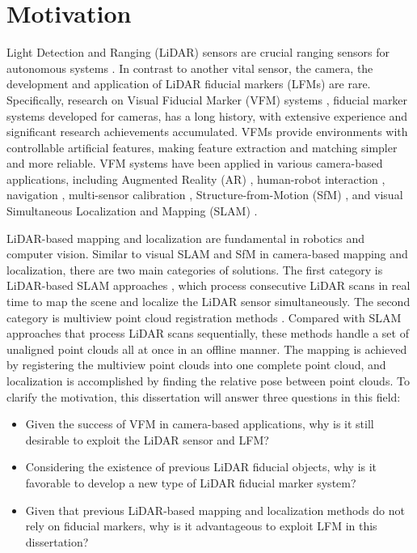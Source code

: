 \section{Motivation}
Light Detection and Ranging (LiDAR) sensors are crucial ranging sensors for autonomous systems \cite{loam,traj,rangenet}. In contrast to another vital sensor, the camera, the development and application of LiDAR fiducial markers (LFMs) are rare. Specifically, research on Visual Fiducial Marker (VFM) systems \cite{wang,olson,ap3,aruco,cctag}, fiducial marker systems developed for cameras, has a long history, with extensive experience and significant research achievements accumulated. VFMs provide environments with controllable artificial features, making feature extraction and matching simpler and more reliable. VFM systems have been applied in various camera-based applications, including Augmented Reality (AR) \cite{ar}, human-robot interaction \cite{wang,olson}, navigation \cite{yibo1,yibo2,liao}, multi-sensor calibration \cite{kalibr,lt2}, Structure-from-Motion (SfM) \cite{munoz,qingdao}, and visual Simultaneous Localization and Mapping (SLAM) \cite{munoz2019,shuo,shuo2}. \par
LiDAR-based mapping and localization \cite{loam,lloam,sdk,traj,sghr,multiway,mdgd} are fundamental in robotics and computer vision. Similar to visual SLAM \cite{shuo,shuo2,shuo3} and SfM \cite{munoz,qingdao} in camera-based mapping and localization, there are two main categories of solutions. The first category is LiDAR-based SLAM approaches \cite{loam,lloam,sdk,traj}, which process consecutive LiDAR scans in real time to map the scene and localize the LiDAR sensor simultaneously. The second category is multiview point cloud registration methods \cite{sghr,multiway,mdgd}. Compared with SLAM approaches that process LiDAR scans sequentially, these methods handle a set of unaligned point clouds all at once in an offline manner. The mapping is achieved by registering the multiview point clouds into one complete point cloud, and localization is accomplished by finding the relative pose between point clouds.
To clarify the motivation, this dissertation will answer three questions in this field:
\begin{itemize}
\item Given the success of VFM in camera-based applications, why is it still desirable to exploit the LiDAR sensor and LFM?

\item Considering the existence of previous LiDAR fiducial objects, why is it favorable to develop a new type of LiDAR fiducial marker system?

\item Given that previous LiDAR-based mapping and localization methods do not rely on fiducial markers, why is it advantageous to exploit LFM in this dissertation?
\end{itemize}
